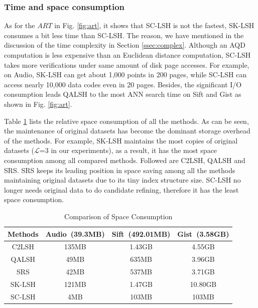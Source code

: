 \documentclass[twocolumn]{svjour3}          %
\begin{document}
\subsubsection{Time and space consumption}
As for the $ART$ in Fig. \ref{fig:art}, it shows that SC-LSH is not the fastest, SK-LSH consumes a bit less time than SC-LSH. The reason, we have mentioned in the discussion of the time complexity in Section \ref{ssec:complex}. Although an AQD computation is less expensive than an Euclidean distance computation, SC-LSH takes more verifications under same amount of disk page accesses. For example, on Audio, SK-LSH can get about 1,000 points in 200 pages, while SC-LSH can access nearly 10,000 data codes even in 20 pages.
Besides, the significant I/O consumption leads QALSH to the most ANN search time on Sift and Gist as shown in Fig. \ref{fig:art}.

Table \ref{tbl:spaceconsumption} lists the relative space consumption of all the methods. As can be seen, the maintenance of original datasets has become the dominant storage overhead of the methods. For example, SK-LSH maintains the most copies of original datasets ($\mathcal{L}$=3 in our experiments), as a result, it has the most space consumption among all compared methods. Followed are C2LSH, QALSH and SRS. SRS keeps its leading position in space saving among all the methods maintaining original datasets due to its tiny index structure size. SC-LSH no longer needs original data to do candidate refining, therefore it has the least space consumption. 

\begin{table}[t]
	\centering
	\caption{Comparison of Space Consumption\label{tbl:spaceconsumption}}
	\begin{tabular}{|c|c|c|c|}
		\hline
		Methods & \textbf{Audio}~(39.3MB) & \textbf{Sift}~(492.01MB) & \textbf{Gist}~(3.58GB) \\
		\hline
		C2LSH & 135MB & 1.43GB & 4.55GB  \\
		\hline
		QALSH & 49MB & 635MB & 3.96GB \\
		\hline
		SRS & 42MB & 537MB & 3.71GB \\
		\hline
		SK-LSH & 121MB & 1.47GB & 10.80GB \\
		\hline
		SC-LSH & 4MB & 103MB & 103MB \\
		\hline
	\end{tabular}
\end{table}%
\end{document}
